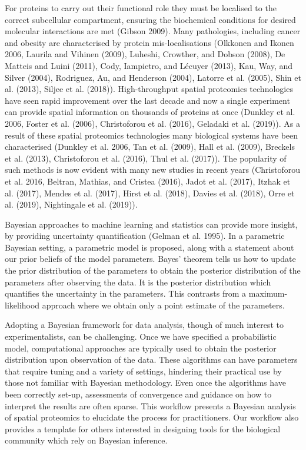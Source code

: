 \documentclass[]{article}
\begin{document}
For proteins to carry out their functional role they must be localised
to the correct subcellular compartment, ensuring the biochemical
conditions for desired molecular interactions are met (Gibson 2009).
Many pathologies, including cancer and obesity are characterised by
protein mis-localisations (Olkkonen and Ikonen 2006, Laurila and Vihinen
(2009), Luheshi, Crowther, and Dobson (2008), De Matteis and Luini
(2011), Cody, Iampietro, and Lécuyer (2013), Kau, Way, and Silver
(2004), Rodriguez, Au, and Henderson (2004), Latorre et al. (2005), Shin
et al. (2013), Siljee et al. (2018)). High-throughput spatial proteomics
technologies have seen rapid improvement over the last decade and now a
single experiment can provide spatial information on thousands of
proteins at once (Dunkley et al. 2006, Foster et al. (2006),
Christoforou et al. (2016), Geladaki et al. (2019)). As a result of
these spatial proteomics technologies many biological systems have been
characterised (Dunkley et al. 2006, Tan et al. (2009), Hall et al.
(2009), Breckels et al. (2013), Christoforou et al. (2016), Thul et al.
(2017)). The popularity of such methods is now evident with many new
studies in recent years (Christoforou et al. 2016, Beltran, Mathias, and
Cristea (2016), Jadot et al. (2017), Itzhak et al. (2017), Mendes et al.
(2017), Hirst et al. (2018), Davies et al. (2018), Orre et al. (2019),
Nightingale et al. (2019)).

Bayesian approaches to machine learning and statistics can provide more
insight, by providing uncertainty quantification (Gelman et al. 1995).
In a parametric Bayesian setting, a parametric model is proposed, along
with a statement about our prior beliefs of the model parameters. Bayes'
theorem tells us how to update the prior distribution of the parameters
to obtain the posterior distribution of the parameters after observing
the data. It is the posterior distribution which quantifies the
uncertainty in the parameters. This contrasts from a maximum-likelihood
approach where we obtain only a point estimate of the parameters.

Adopting a Bayesian framework for data analysis, though of much interest
to experimentalists, can be challenging. Once we have specified a
probabilistic model, computational approaches are typically used to
obtain the posterior distribution upon observation of the data. These
algorithms can have parameters that require tuning and a variety of
settings, hindering their practical use by those not familiar with
Bayesian methodology. Even once the algorithms have been correctly
set-up, assessments of convergence and guidance on how to interpret the
results are often sparse. This workflow presents a Bayesian analysis of
spatial proteomics to elucidate the process for practitioners. Our
workflow also provides a template for others interested in designing
tools for the biological community which rely on Bayesian inference.
\end{document}

